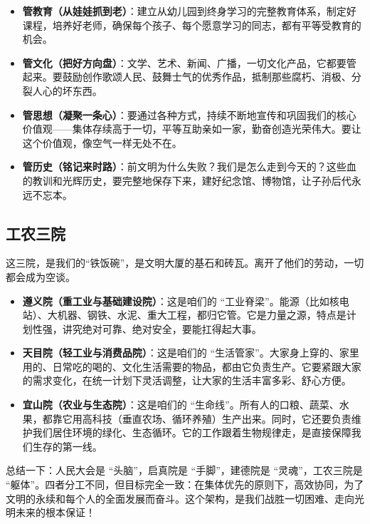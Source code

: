 \begin{itemize}
\item
  \textbf{管教育（从娃娃抓到老）}：建立从幼儿园到终身学习的完整教育体系，制定好课程，培养好老师，确保每个孩子、每个愿意学习的同志，都有平等受教育的机会。
\item
  \textbf{管文化（把好方向盘）}：文学、艺术、新闻、广播，一切文化产品，它都要管起来。要鼓励创作歌颂人民、鼓舞士气的优秀作品，抵制那些腐朽、消极、分裂人心的坏东西。
\item
  \textbf{管思想（凝聚一条心）}：要通过各种方式，持续不断地宣传和巩固我们的核心价值观------集体存续高于一切，平等互助亲如一家，勤奋创造光荣伟大。要让这个价值观，像空气一样无处不在。
\item
  \textbf{管历史（铭记来时路）}：前文明为什么失败？我们是怎么走到今天的？这些血的教训和光辉历史，要完整地保存下来，建好纪念馆、博物馆，让子孙后代永远不忘本。
\end{itemize}

\subsection{工农三院}\label{ux5de5ux519cux4e09ux9662}

这三院，是我们的``铁饭碗''，是文明大厦的基石和砖瓦。离开了他们的劳动，一切都会成为空谈。

\begin{itemize}
\item
  \textbf{遵义院（重工业与基础建设院）}：这是咱们的 ``工业脊梁''。能源（比如核电站）、大机器、钢铁、水泥、重大工程，都归它管。它是力量之源，特点是计划性强，讲究绝对可靠、绝对安全，要能扛得起大事。
\item
  \textbf{天目院（轻工业与消费品院）}：这是咱们的 ``生活管家''。大家身上穿的、家里用的、日常吃的喝的、文化生活需要的物品，都由它负责生产。它要紧跟大家的需求变化，在统一计划下灵活调整，让大家的生活丰富多彩、舒心方便。
\item
  \textbf{宜山院（农业与生态院）}：这是咱们的 ``生命线''。所有人的口粮、蔬菜、水果，都靠它用高科技（垂直农场、循环养殖）生产出来。同时，它还要负责维护我们居住环境的绿化、生态循环。它的工作跟着生物规律走，是直接保障我们生存的第一线。
\end{itemize}

总结一下：人民大会是 ``头脑''，启真院是 ``手脚''，建德院是 ``灵魂''，工农三院是 ``躯体''。四者分工不同，但目标完全一致：在集体优先的原则下，高效协同，为了文明的永续和每个人的全面发展而奋斗。这个架构，是我们战胜一切困难、走向光明未来的根本保证！


